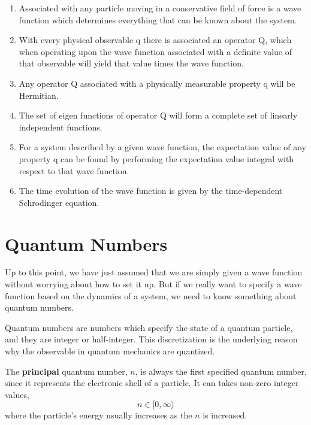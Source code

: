 \begin{enumerate}
\item Associated with any particle moving in a conservative field of force is a wave function which determines everything that can be known about the system.

\item With every physical observable q there is associated an operator Q, which when operating upon the wave function associated with a definite value of that observable will yield that value times the wave function.

\item Any operator Q associated with a physically measurable property q will be Hermitian.

\item The set of eigen functions of operator Q will form a complete set of linearly independent functions.

\item For a system described by a given wave function, the expectation value of any property q can be found by performing the expectation value integral with respect to that wave function.

\item The time evolution of the wave function is given by the time-dependent Schrodinger equation. 
\end{enumerate}

\section{Quantum Numbers}
Up to this point, we have just assumed that we are simply given a wave function without worrying about how to set it up. But if we really want to specify a wave function based on the dynamics of a system, we need to know something about quantum numbers.

Quantum numbers are numbers which specify the state of a quantum particle, and they are integer or half-integer. This discretization is the underlying reason why the observable in quantum mechanics are quantized. 

The \textbf{principal} quantum number, $n$, is always the first specified quantum number, since it represents the electronic shell of a particle. It can takes non-zero integer values, 
\begin{equation}
n\in[0,\infty\rangle
\end{equation}
where the particle's energy usually increases as the $n$ is increased. 

